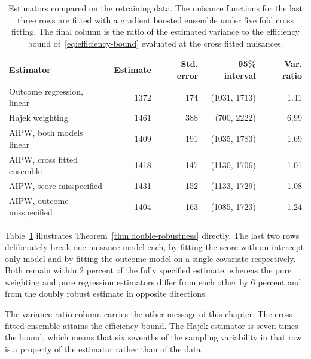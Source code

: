 \begin{table}[t]
\centering
\caption[Estimators compared on the retraining data]{Estimators compared on the
retraining data. The nuisance functions for the last three rows are fitted with
a gradient boosted ensemble under five fold cross fitting. The final column is
the ratio of the estimated variance to the efficiency bound
of~\eqref{eq:efficiency-bound} evaluated at the cross fitted nuisances.}
\label{tab:dr-comparison}
\begin{tabular}{lrrrr}
\toprule
Estimator & Estimate & Std. error & 95\% interval & Var. ratio \\
\midrule
Outcome regression, linear   & 1372 & 174 & (1031, 1713) & 1.41 \\
Hajek weighting              & 1461 & 388 & (700, 2222)  & 6.99 \\
AIPW, both models linear     & 1409 & 191 & (1035, 1783) & 1.69 \\
AIPW, cross fitted ensemble  & 1418 & 147 & (1130, 1706) & 1.01 \\
AIPW, score misspecified     & 1431 & 152 & (1133, 1729) & 1.08 \\
AIPW, outcome misspecified   & 1404 & 163 & (1085, 1723) & 1.24 \\
\bottomrule
\end{tabular}
\end{table}

Table~\ref{tab:dr-comparison} illustrates Theorem~\ref{thm:double-robustness}
directly. The last two rows deliberately break one nuisance model each, by
fitting the score with an intercept only model and by fitting the outcome model
on a single covariate respectively. Both remain within 2 percent of the fully
specified estimate, whereas the pure weighting and pure regression estimators
differ from each other by 6 percent and from the doubly robust estimate in
opposite directions.

The variance ratio column carries the other message of this chapter. The cross
fitted ensemble attains the efficiency bound. The Hajek estimator is seven times
the bound, which means that six sevenths of the sampling variability in that row
is a property of the estimator rather than of the data.
